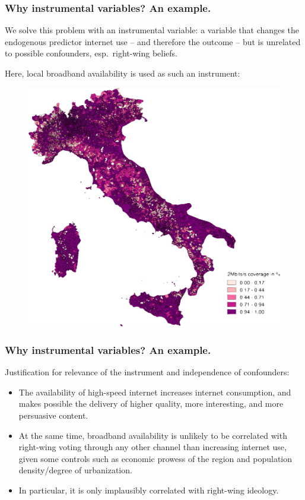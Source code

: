 \documentclass[12pt,english,dvipsnames,aspectratio=169,handout]{beamer}\usepackage[]{graphicx}\usepackage[]{xcolor}
\begin{document}
\begin{frame}
  \frametitle{Why instrumental variables? An example.}
  \footnotesize 
  We solve this problem with an instrumental variable: a variable that changes the endogenous predictor internet use -- and therefore the outcome -- but is unrelated to possible confounders, esp.\ right-wing beliefs. 
  
  Here, local broadband availability is used as such an instrument:
	 \begin{figure} 
    \includegraphics[height=.55\textheight, keepaspectratio=true]{../04-figures/05/07-bbcoverage_italy}
    \end{figure}
\end{frame}


\begin{frame}
  \frametitle{Why instrumental variables? An example.}
  Justification for relevance of the instrument and independence of confounders:
	\begin{itemize} \footnotesize 
		\item The availability of high-speed internet increases internet consumption, and makes possible the delivery of higher quality, more interesting, and more persuasive content. 
		\item At the same time, broadband availability is unlikely to be correlated with right-wing voting through any other channel than increasing internet use, given some controls such as economic prowess of the region and population density/degree of urbanization. 
		\item In particular, it is only implausibly correlated with right-wing ideology.
	\end {itemize}
\vspace{3cm}
\end{frame}
\end{document}
